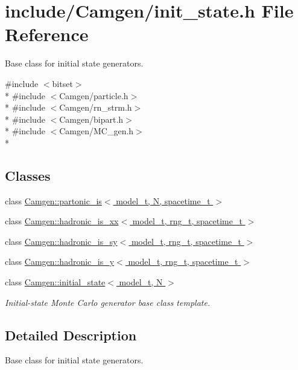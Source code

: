 \hypertarget{a00649}{\section{include/\-Camgen/init\-\_\-state.h File Reference}
\label{a00649}
}


Base class for initial state generators.  


{\ttfamily \#include $<$bitset$>$}\\*
{\ttfamily \#include $<$Camgen/particle.\-h$>$}\\*
{\ttfamily \#include $<$Camgen/rn\-\_\-strm.\-h$>$}\\*
{\ttfamily \#include $<$Camgen/bipart.\-h$>$}\\*
{\ttfamily \#include $<$Camgen/\-M\-C\-\_\-gen.\-h$>$}\\*
\subsection*{Classes}
\begin{DoxyCompactItemize}
\item 
class \hyperlink{a00406}{Camgen\-::partonic\-\_\-is$<$ model\-\_\-t, N, spacetime\-\_\-t $>$}
\item 
class \hyperlink{a00256}{Camgen\-::hadronic\-\_\-is\-\_\-xx$<$ model\-\_\-t, rng\-\_\-t, spacetime\-\_\-t $>$}
\item 
class \hyperlink{a00254}{Camgen\-::hadronic\-\_\-is\-\_\-sy$<$ model\-\_\-t, rng\-\_\-t, spacetime\-\_\-t $>$}
\item 
class \hyperlink{a00258}{Camgen\-::hadronic\-\_\-is\-\_\-y$<$ model\-\_\-t, rng\-\_\-t, spacetime\-\_\-t $>$}
\item 
class \hyperlink{a00304}{Camgen\-::initial\-\_\-state$<$ model\-\_\-t, N $>$}
\begin{DoxyCompactList}\small\item\em Initial-\/state Monte Carlo generator base class template. \end{DoxyCompactList}\end{DoxyCompactItemize}


\subsection{Detailed Description}
Base class for initial state generators. 